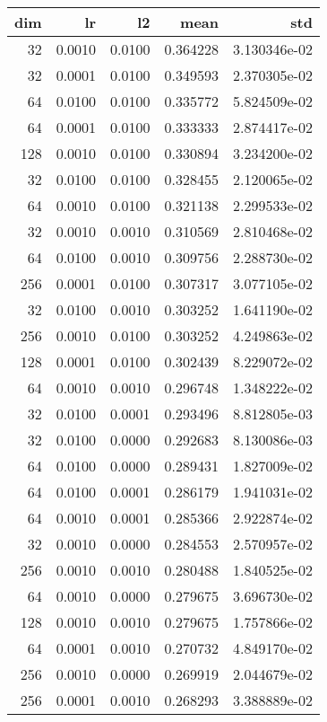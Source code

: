 \begin{tabular}{rrrrr}
\toprule
 dim &      lr &      l2 &      mean &           std \\
\midrule
  32 &  0.0010 &  0.0100 &  0.364228 &  3.130346e-02 \\
  32 &  0.0001 &  0.0100 &  0.349593 &  2.370305e-02 \\
  64 &  0.0100 &  0.0100 &  0.335772 &  5.824509e-02 \\
  64 &  0.0001 &  0.0100 &  0.333333 &  2.874417e-02 \\
 128 &  0.0010 &  0.0100 &  0.330894 &  3.234200e-02 \\
  32 &  0.0100 &  0.0100 &  0.328455 &  2.120065e-02 \\
  64 &  0.0010 &  0.0100 &  0.321138 &  2.299533e-02 \\
  32 &  0.0010 &  0.0010 &  0.310569 &  2.810468e-02 \\
  64 &  0.0100 &  0.0010 &  0.309756 &  2.288730e-02 \\
 256 &  0.0001 &  0.0100 &  0.307317 &  3.077105e-02 \\
  32 &  0.0100 &  0.0010 &  0.303252 &  1.641190e-02 \\
 256 &  0.0010 &  0.0100 &  0.303252 &  4.249863e-02 \\
 128 &  0.0001 &  0.0100 &  0.302439 &  8.229072e-02 \\
  64 &  0.0010 &  0.0010 &  0.296748 &  1.348222e-02 \\
  32 &  0.0100 &  0.0001 &  0.293496 &  8.812805e-03 \\
  32 &  0.0100 &  0.0000 &  0.292683 &  8.130086e-03 \\
  64 &  0.0100 &  0.0000 &  0.289431 &  1.827009e-02 \\
  64 &  0.0100 &  0.0001 &  0.286179 &  1.941031e-02 \\
  64 &  0.0010 &  0.0001 &  0.285366 &  2.922874e-02 \\
  32 &  0.0010 &  0.0000 &  0.284553 &  2.570957e-02 \\
 256 &  0.0010 &  0.0010 &  0.280488 &  1.840525e-02 \\
  64 &  0.0010 &  0.0000 &  0.279675 &  3.696730e-02 \\
 128 &  0.0010 &  0.0010 &  0.279675 &  1.757866e-02 \\
  64 &  0.0001 &  0.0010 &  0.270732 &  4.849170e-02 \\
 256 &  0.0010 &  0.0000 &  0.269919 &  2.044679e-02 \\
 256 &  0.0001 &  0.0010 &  0.268293 &  3.388889e-02 \\

\end{tabular}
